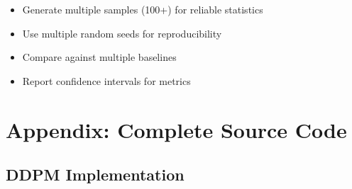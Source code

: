\documentclass[a4paper,12pt]{article}
\begin{document}
\begin{itemize}
    \item Generate multiple samples (100+) for reliable statistics
    \item Use multiple random seeds for reproducibility
    \item Compare against multiple baselines
    \item Report confidence intervals for metrics
\end{itemize}

\clearpage
\section{Appendix: Complete Source Code}

\subsection{DDPM Implementation}
\end{document}
